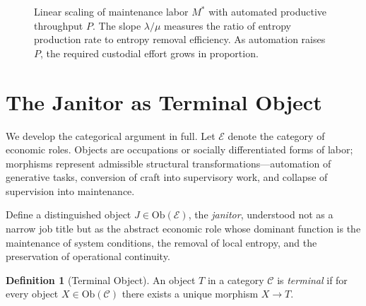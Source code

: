 \documentclass[12pt,a4paper]{article}
\theoremstyle{plain}
\theoremstyle{definition}
\newtheorem{definition}[theorem]{Definition}
\theoremstyle{remark}
\begin{document}
\begin{figure}[h]
\centering
{}
\caption{Linear scaling of maintenance labor $M^*$ with automated
productive throughput $P$.  The slope $\lambda/\mu$ measures the ratio of
entropy production rate to entropy removal efficiency.  As automation raises
$P$, the required custodial effort grows in proportion.}
\label{fig:entropy}
\end{figure}

\section{The Janitor as Terminal Object}
\label{app:categ}

We develop the categorical argument in full.  Let $\mathcal{E}$ denote the
category of economic roles.  Objects are occupations or socially
differentiated forms of labor; morphisms represent admissible structural
transformations---automation of generative tasks, conversion of craft into
supervisory work, and collapse of supervision into maintenance.

Define a distinguished object $J \in \mathrm{Ob}(\mathcal{E})$, the
\emph{janitor}, understood not as a narrow job title but as the abstract
economic role whose dominant function is the maintenance of system conditions,
the removal of local entropy, and the preservation of operational continuity.

\begin{definition}[Terminal Object]
An object $T$ in a category $\mathcal{C}$ is \emph{terminal} if for every
object $X \in \mathrm{Ob}(\mathcal{C})$ there exists a unique morphism
$X \to T$.
\end{definition}
\end{document}
